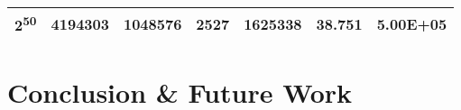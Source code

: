 \documentclass[runningheads]{llncs}
\begin{document}
\begin{table}
\begin{tabular}{|c|c|c!{\color{black}\vrule}c|c|c|c|}
		{}2\textsuperscript{50}                                                           & 4194303                                                                                                                    & {}1048576          & 2527                                                       & {}1625338                                                                                                                                                      & 38.751                                                      & {}5.00E+05                                                                                                                                                      \\
		\hline
	\end{tabular}
\end{table}



\section{Conclusion \& Future Work }



 
%
%


%
% 
% 
%
\end{document}
